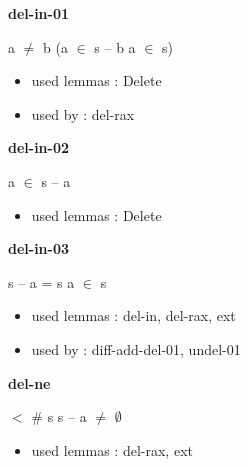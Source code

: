 \documentclass[a4paper]{article}
\begin{document}
\bigskip

{\large\bf del-in-01}

\medskip

 \Fol a $\neq$ b \Imp (\Not a $\in$ s -- b \Equiv \Not a $\in$ s)

\begin{itemize}


\item       used lemmas  : Delete
\item       used by      : del-rax

\end{itemize}

\medskip

\bigskip

{\large\bf del-in-02}

\medskip

 \Fol \Not a $\in$ s -- a

\begin{itemize}


\item       used lemmas  : Delete

\end{itemize}

\medskip

\bigskip

{\large\bf del-in-03}

\medskip

 \Fol s -- a = s \Equiv \Not a $\in$ s

\begin{itemize}


\item       used lemmas  : del-in, del-rax, ext
\item       used by      : diff-add-del-01, undel-01

\end{itemize}

\medskip

\bigskip

{\large\bf del-ne}

\medskip

  $<$ \# s \Imp s -- a $\neq$ $\emptyset$

\begin{itemize}


\item       used lemmas  : del-rax, ext

\end{itemize}

\medskip
\end{document}
